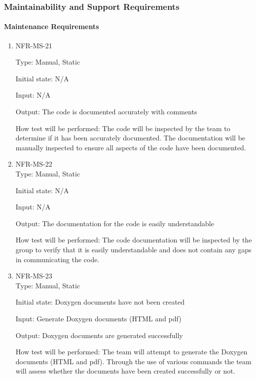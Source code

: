 \documentclass[12pt, titlepage]{article}
\begin{document}
\subsubsection{Maintainability and Support Requirements}
\paragraph{Maintenance Requirements}
\begin{enumerate}
    \item{NFR-MS-21\\}
    
    Type: Manual, Static
    
    Initial state: N/A
    
    Input: N/A
    
    Output: The code is documented accurately with comments

    How test will be performed: The code will be inspected by the team to determine if it has been accurately documented. The documentation will be manually inspected to ensure all aspects of the code have been documented.
    
    \item{NFR-MS-22\\}
    Type: Manual, Static
    
    Initial state: N/A
    
    Input: N/A
    
    Output: The documentation for the code is easily understandable
    
    How test will be performed: The code documentation will be inspected by the group to verify that it is easily understandable and does not contain any gaps in communicating the code. 
    
    \item{NFR-MS-23\\}
    Type: Manual, Static
    
    Initial state: Doxygen documents have not been created
    
    Input: Generate Doxygen documents (HTML and pdf)
    
    Output: Doxygen documents are generated successfully
    
    How test will be performed: The team will attempt to generate the Doxygen documents (HTML and pdf). Through the use of various commands the team will assess whether the documents have been created successfully or not.
    
 \end{enumerate} 
 
\end{document}
